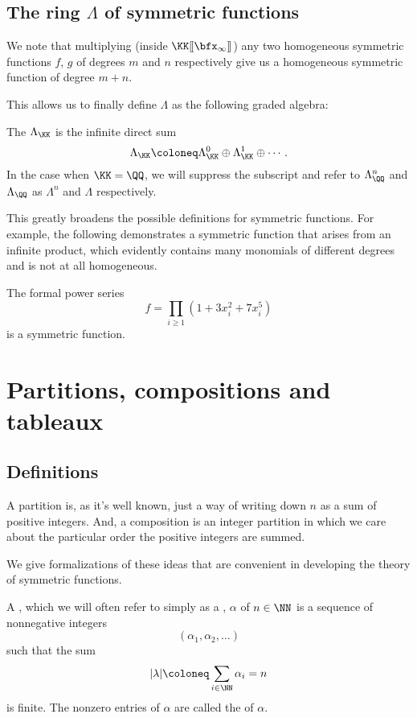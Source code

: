 \documentclass{article}
\newcommand{\fps}[2]{#1 [\kern-1.2pt[ {#2} ]\kern-1.2pt]}
\begin{document}
\subsection{The ring $\Lambda$ of symmetric functions}

We note that multiplying (inside $\fps{\KK}{\bfx_\infty}$) any two homogeneous symmetric functions $f$, $g$ of degrees $m$ and $n$ respectively give us a homogeneous symmetric function of degree $m+n$.

This allows us to finally define $\Lambda$ as the following graded algebra:

\begin{definition}
    The  $\Lambda_\KK$ is the infinite direct sum
    \[
        \Lambda_\KK \coloneq \Lambda_\KK^0 \oplus\Lambda_\KK^1 \oplus \cdots.
    \]
    In the case when $\KK = \QQ$, we will suppress the subscript and refer to $\Lambda_\QQ^n$ and $\Lambda_\QQ$ as $\Lambda^n$ and $\Lambda$ respectively.
\end{definition}

This greatly broadens the possible definitions for symmetric functions. 
For example, the following demonstrates a symmetric function that arises from an infinite product, which evidently contains many monomials of different degrees and is not at all homogeneous.

\begin{example}
    The formal power series 
    \[
        f = \prod_{i\geq1} (1 + 3x_i^2 + 7x_i^5)
    \]
    is a symmetric function.
\end{example}

\section{Partitions, compositions and tableaux}

\subsection{Definitions}

A partition is, as it's well known, just a way of writing down $n$ as a sum of positive integers.
And, a composition is an integer partition in which we care about the particular order the positive integers are summed.

We give formalizations of these ideas that are convenient in developing the theory of symmetric functions.

\begin{definition}
    A , which we will often refer to simply as a , $\alpha$ of $n \in \NN$ is a sequence of nonnegative integers 
    \[
        (\alpha_1,\alpha_2,\ldots)
    \]
    such that the sum
    \[
        |\lambda|
        \coloneq
        \sum_{i\in\NN}
        \alpha_i
        =
        n
    \]
    is finite.
    The nonzero entries of $\alpha$ are called the  of $\alpha$.
\end{definition}
\end{document}
